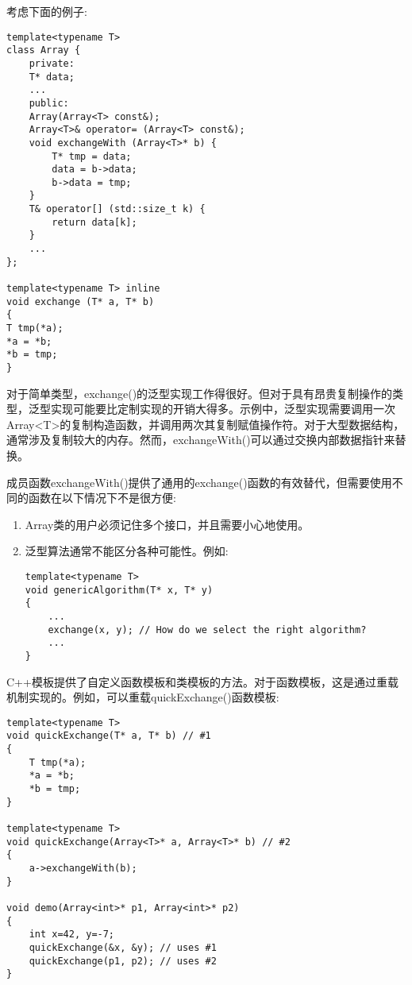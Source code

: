 
考虑下面的例子:

\begin{lstlisting}[style=styleCXX]
template<typename T>
class Array {
	private:
	T* data;
	...
	public:
	Array(Array<T> const&);
	Array<T>& operator= (Array<T> const&);
	void exchangeWith (Array<T>* b) {
		T* tmp = data;
		data = b->data;
		b->data = tmp;
	}
	T& operator[] (std::size_t k) {
		return data[k];
	}
	...
};

template<typename T> inline
void exchange (T* a, T* b)
{
T tmp(*a);
*a = *b;
*b = tmp;
}
\end{lstlisting}

对于简单类型，exchange()的泛型实现工作得很好。但对于具有昂贵复制操作的类型，泛型实现可能要比定制实现的开销大得多。示例中，泛型实现需要调用一次Array<T>的复制构造函数，并调用两次其复制赋值操作符。对于大型数据结构，通常涉及复制较大的内存。然而，exchangeWith()可以通过交换内部数据指针来替换。


成员函数exchangeWith()提供了通用的exchange()函数的有效替代，但需要使用不同的函数在以下情况下不是很方便:

\begin{enumerate}
\item 
Array类的用户必须记住多个接口，并且需要小心地使用。

\item 
泛型算法通常不能区分各种可能性。例如:

\begin{lstlisting}[style=styleCXX]
template<typename T>
void genericAlgorithm(T* x, T* y)
{
	...
	exchange(x, y); // How do we select the right algorithm?
	...
}
\end{lstlisting}

\end{enumerate}

C++模板提供了自定义函数模板和类模板的方法。对于函数模板，这是通过重载机制实现的。例如，可以重载quickExchange()函数模板:

\begin{lstlisting}[style=styleCXX]
template<typename T>
void quickExchange(T* a, T* b) // #1
{
	T tmp(*a);
	*a = *b;
	*b = tmp;
}

template<typename T>
void quickExchange(Array<T>* a, Array<T>* b) // #2
{
	a->exchangeWith(b);
}

void demo(Array<int>* p1, Array<int>* p2)
{
	int x=42, y=-7;
	quickExchange(&x, &y); // uses #1
	quickExchange(p1, p2); // uses #2
}
\end{lstlisting}

